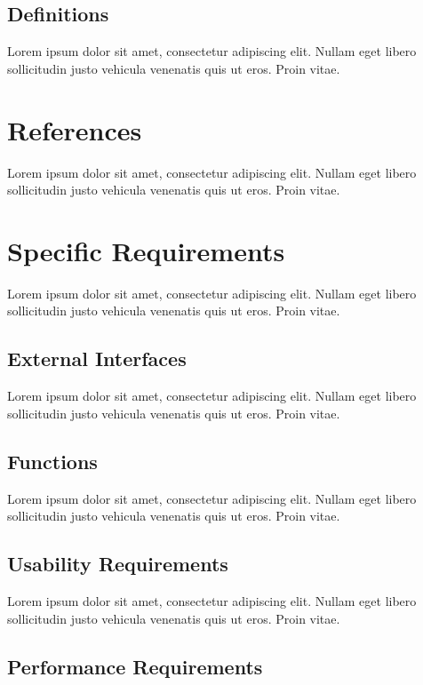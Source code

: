 \documentclass[a4paper]{article}
\begin{document}
            \subsection{Definitions}

            Lorem ipsum dolor sit amet, consectetur adipiscing elit. Nullam eget libero sollicitudin justo vehicula venenatis quis ut eros. Proin vitae.

    \section{References}

    Lorem ipsum dolor sit amet, consectetur adipiscing elit. Nullam eget libero sollicitudin justo vehicula venenatis quis ut eros. Proin vitae.

    \section{Specific Requirements}

    Lorem ipsum dolor sit amet, consectetur adipiscing elit. Nullam eget libero sollicitudin justo vehicula venenatis quis ut eros. Proin vitae.

        \subsection{External Interfaces}

        Lorem ipsum dolor sit amet, consectetur adipiscing elit. Nullam eget libero sollicitudin justo vehicula venenatis quis ut eros. Proin vitae.

        \subsection{Functions}

        Lorem ipsum dolor sit amet, consectetur adipiscing elit. Nullam eget libero sollicitudin justo vehicula venenatis quis ut eros. Proin vitae.

        \subsection{Usability Requirements}

        Lorem ipsum dolor sit amet, consectetur adipiscing elit. Nullam eget libero sollicitudin justo vehicula venenatis quis ut eros. Proin vitae.

        \subsection{Performance Requirements}
\end{document}
